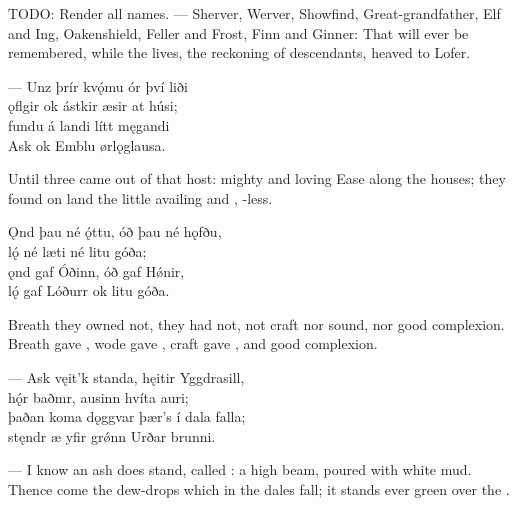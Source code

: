 \bvb TODO: Render all names. — Sherver, Werver, Showfind, Great-grandfather, Elf and Ing, Oakenshield, Feller and Frost, Finn and Ginner: That will ever be remembered, while the  lives\footnotemark[1], the reckoning of descendants, heaved to Lofer.\evb
{}


\bva — Unz þrír kvǫ́mu \hld ór því liði \\%
ǫflgir ok ástkir \hld æsir at húsi; \\%
fundu á landi \hld lítt męgandi \\%
Ask ok Emblu \hld ørlǫglausa.\eva

\bvb Until three came out of that host: mighty and loving Ease along the houses; they found on land the little availing  and , -less.\footnotemark[1]\evb
{}

\bva Ǫnd þau né ǫ́ttu, \hld óð þau né hǫfðu, \\%
lǫ́ né læti \hld né litu góða; \\%
ǫnd gaf Óðinn, \hld óð gaf Hǿnir, \\%
lǫ́ gaf Lóðurr \hld ok litu góða.\eva

\bvb Breath they owned not,  they had not, not craft nor sound, nor good complexion. Breath gave , wode gave , craft gave , and good complexion.\evb


\bva — Ask vęit’k standa, \hld hęitir Yggdrasill, \\%
hǫ́r baðmr, ausinn \hld hvíta auri; \\%
þaðan koma dǫggvar \hld þær’s í dala falla; \\%
stęndr æ yfir grǿnn \hld Urðar brunni.\eva

\bvb — I know an ash does stand, called : a high beam\footnotemark[1], poured with white mud\footnotemark[2]. Thence come the dew-drops which in the dales fall; it stands ever green over the .\evb
{}


